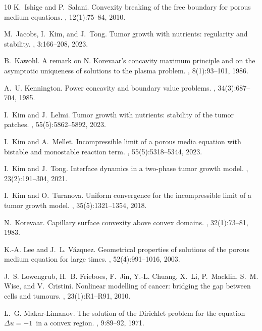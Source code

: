 \documentclass[10pt]{article}         %
\numberwithin{equation}{section}
\begin{document}
\begin{thebibliography}{10}
K.~Ishige and P.~Salani.
\newblock Convexity breaking of the free boundary for porous medium equations.
, 12(1):75--84, 2010.

M.~Jacobs, I.~Kim, and J.~Tong.
\newblock Tumor growth with nutrients: regularity and stability.
, 3:166--208, 2023.

B.~Kawohl.
\newblock A remark on {N}. {K}orevaar's concavity maximum principle and on the
  asymptotic uniqueness of solutions to the plasma problem.
, 8(1):93--101, 1986.

A.~U. Kennington.
\newblock Power concavity and boundary value problems.
, 34(3):687--704, 1985.

I.~Kim and J.~Lelmi.
\newblock Tumor growth with nutrients: stability of the tumor patches.
, 55(5):5862--5892, 2023.

I.~Kim and A.~Mellet.
\newblock Incompressible limit of a porous media equation with bistable and
  monostable reaction term.
, 55(5):5318--5344, 2023.

I.~Kim and J.~Tong.
\newblock Interface dynamics in a two-phase tumor growth model.
, 23(2):191--304, 2021.

I.~Kim and O.~Turanova.
\newblock Uniform convergence for the incompressible limit of a tumor growth
  model.
,
  35(5):1321--1354, 2018.

N.~Korevaar.
\newblock Capillary surface convexity above convex domains.
, 32(1):73--81, 1983.

K.-A. Lee and J.~L. V\'azquez.
\newblock Geometrical properties of solutions of the porous medium equation for
  large times.
, 52(4):991--1016, 2003.

J.~S. Lowengrub, H.~B. Frieboes, F.~Jin, Y.-L. Chuang, X.~Li, P.~Macklin, S.~M.
  Wise, and V.~Cristini.
\newblock Nonlinear modelling of cancer: bridging the gap between cells and
  tumours.
, 23(1):R1--R91, 2010.

L.~G. Makar-Limanov.
\newblock The solution of the {D}irichlet problem for the equation {$\Delta
  u=-1$}\ in a convex region.
, 9:89--92, 1971.


\end{thebibliography}
\end{document}

